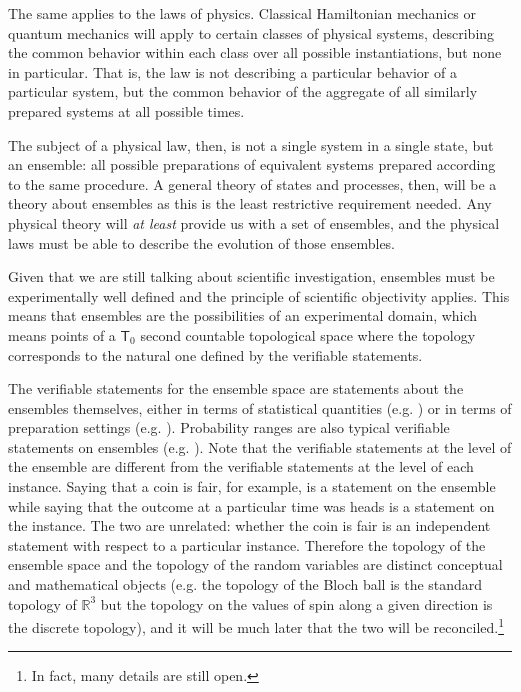 The same applies to the laws of physics. Classical Hamiltonian mechanics or quantum mechanics will apply to certain classes of physical systems, describing the common behavior within each class over all possible instantiations, but none in particular. That is, the law is not describing a particular behavior of a particular system, but the common behavior of the aggregate of all similarly prepared systems at all possible times.

The subject of a physical law, then, is not a single system in a single state, but an ensemble: all possible preparations of equivalent systems prepared according to the same procedure. A general theory of states and processes, then, will be a theory about ensembles as this is the least restrictive requirement needed. Any physical theory will \emph{at least} provide us with a set of ensembles, and the physical laws must be able to describe the evolution of those ensembles.

Given that we are still talking about scientific investigation, ensembles must be experimentally well defined and the principle of scientific objectivity applies. This means that ensembles are the possibilities of an experimental domain, which means points of a $\textsf{T}_0$ second countable topological space where the topology corresponds to the natural one defined by the verifiable statements.

The verifiable statements for the ensemble space are statements about the ensembles themselves, either in terms of statistical quantities (e.g. ) or in terms of preparation settings (e.g. ). Probability ranges are also typical verifiable statements on ensembles (e.g. ). Note that the verifiable statements at the level of the ensemble are different from the verifiable statements at the level of each instance. Saying that a coin is fair, for example, is a statement on the ensemble while saying that the outcome at a particular time was heads is a statement on the instance. The two are unrelated: whether the coin is fair is an independent statement with respect to a particular instance. Therefore the topology of the ensemble space and the topology of the random variables are distinct conceptual and mathematical objects (e.g. the topology of the Bloch ball is the standard topology of $\mathbb{R}^3$ but the topology on the values of spin along a given direction is the discrete topology), and it will be much later that the two will be reconciled.\footnote{In fact, many details are still open.}

